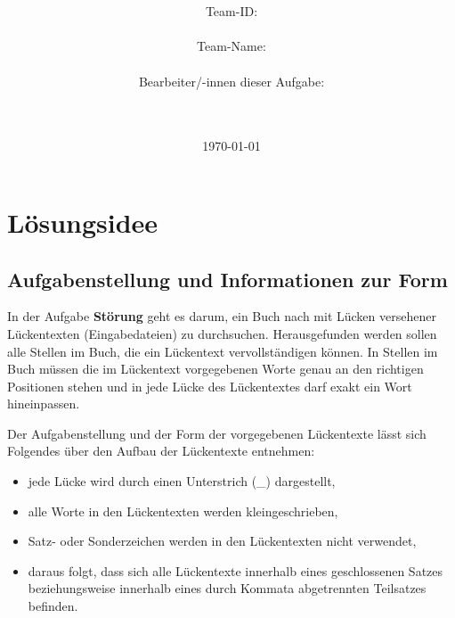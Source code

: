 \documentclass[a4paper, 10pt, ngerman]{scrartcl}
\title{\textbf{\Huge\Aufgabe}}
\author{\LARGE Team-ID: \LARGE \TeamId \\\\
\LARGE Team-Name: \LARGE \TeamName \\\\
\LARGE Bearbeiter/-innen dieser Aufgabe: \\
\LARGE \Namen\\\\}
\date{\LARGE\today}
\begin{document}
\maketitle
\tableofcontents

\vspace{0.5cm}

\section{Lösungsidee}\label{sec:losungsidee}
\subsection{Aufgabenstellung und Informationen zur Form}\label{sec:aufgabenstellung}
In der Aufgabe \textbf{Störung} geht es darum,
ein Buch nach mit Lücken versehener Lückentexten (Eingabedateien) zu durchsuchen.
Herausgefunden werden sollen alle Stellen im Buch,
die ein Lückentext vervollständigen können.
In Stellen im Buch müssen die im Lückentext vorgegebenen Worte genau an den richtigen Positionen stehen
und in jede Lücke des Lückentextes darf exakt ein Wort hineinpassen.

Der Aufgabenstellung
und der Form der vorgegebenen Lückentexte lässt sich Folgendes über den Aufbau der Lückentexte entnehmen:
\begin{itemize}
	\item jede Lücke wird durch einen Unterstrich (\_) dargestellt,
	\item alle Worte in den Lückentexten werden kleingeschrieben,
	\item Satz- oder Sonderzeichen werden in den Lückentexten nicht verwendet,
	\item daraus folgt,
	dass sich alle Lückentexte innerhalb eines geschlossenen Satzes beziehungsweise innerhalb eines durch Kommata abgetrennten Teilsatzes befinden.
\end{itemize}
\end{document}
